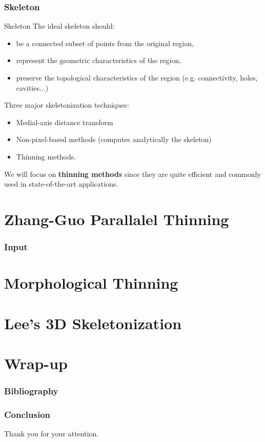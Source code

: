 \documentclass[9pt, t]{beamer}
\begin{document}
\begin{frame}
  \frametitle{Skeleton}
  \begin{block}{Skeleton}
    The ideal skeleton should:
    \begin{itemize}
      \item be a connected subset of points from the original region,
      \item represent the geometric characteristics of the region,
      \item preserve the topological characteristics of the region (e.g. connectivity, holes, cavities...)
    \end{itemize}
  \end{block}

  Three major skeletonization techniques:
  \begin{itemize}
    \item Medial-axis distance transform
    \item Non-pixel-based methods (computes analytically the skeleton)
    \item Thinning methods.
  \end{itemize}
  \vspace{0.5cm}
  We will focus on \textbf{thinning methods} since they are quite efficient and commonly used in state-of-the-art applications.
\end{frame}

\section{Zhang-Guo Parallalel Thinning}
\begin{frame}
  \frametitle{Input}
  \begin{block}

  \end{block}
\end{frame}

\section{Morphological Thinning}

\section{Lee's 3D Skeletonization}

\section{Wrap-up}
\begin{frame}
  \frametitle{Bibliography}
  \printbibliography
\end{frame}
\begin{frame}
  \frametitle{Conclusion}
  \begin{center}
    \Huge Thank you for your attention.
  \end{center}
\end{frame}
\end{document}
